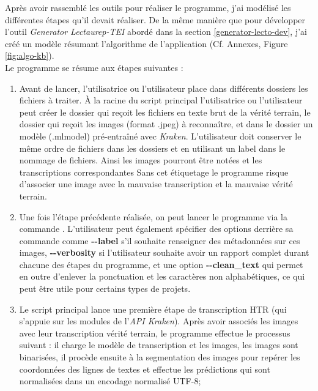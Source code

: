 Après avoir rassemblé les outils pour réaliser le programme, j'ai modélisé les différentes étapes qu'il devait réaliser. De la même manière que pour développer l'outil \textit{Generator Lectaurep-TEI} abordé dans la section \ref{generator-lecto-dev}, j'ai créé un modèle résumant l'algorithme de l'application (Cf. Annexes, Figure \ref{fig:algo-kb}).\\
\newpage
Le programme se résume aux étapes suivantes :
\begin{enumerate}
    \item Avant de lancer, l'utilisatrice ou l'utilisateur place dans différents dossiers les fichiers à traiter. À la racine du script principal  l'utilisatrice ou l'utilisateur peut créer le dossier  qui reçoit les fichiers en texte brut de la vérité terrain, le dossier  qui reçoit les images (format .jpeg) à reconnaître, et dans le dossier  un modèle (.mlmodel) pré-entraîné avec \textit{Kraken}. L'utilisateur doit conserver le même ordre de fichiers dans les dossiers  et  en utilisant un label dans le nommage de fichiers. Ainsi les images pourront être notées  et les transcriptions correspondantes  Sans cet étiquetage le programme risque d'associer une image avec la mauvaise transcription et la mauvaise vérité terrain.\\
    \item Une fois l'étape précédente réalisée, on peut lancer le programme via la commande . L'utilisateur peut également spécifier des options derrière sa commande comme \textbf{-{}-label} s'il souhaite renseigner des métadonnées sur ces images, \textbf{-{}-verbosity} si l'utilisateur souhaite avoir un rapport complet durant chacune des étapes du programme, et une option \textbf{-{}-clean\_text} qui permet en outre d'enlever la ponctuation et les caractères non alphabétiques, ce qui peut être utile pour certains types de projets.\\
    \item Le script principal  lance une première étape de transcription HTR (qui s'appuie sur les modules de l'\textit{API Kraken}). Après avoir associés les images avec leur transcription vérité terrain, le programme effectue le processus suivant : il charge le modèle de transcription et les images, les images sont binarisées, il procède ensuite à la segmentation des images pour repérer les coordonnées des lignes de textes et effectue les prédictions qui sont normalisées dans un encodage normalisé UTF-8;

\end{enumerate}
